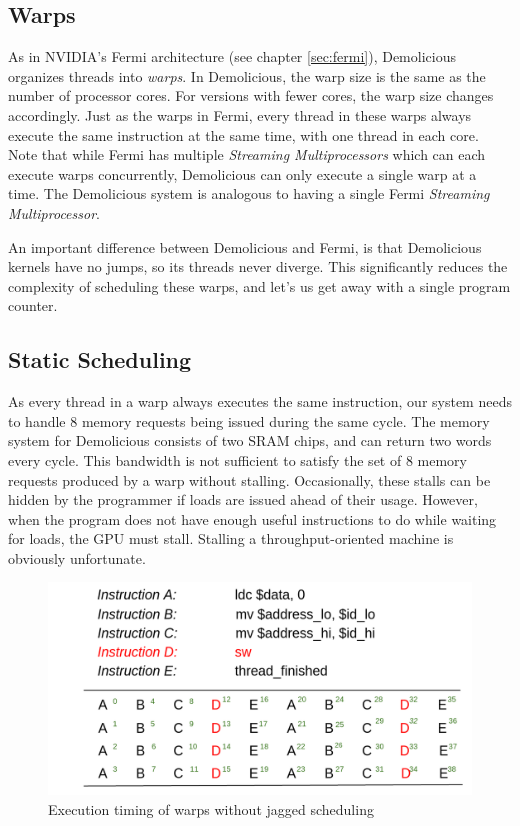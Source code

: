 \documentclass[../main/report.tex]{subfiles}
\begin{document}
\subsection{Warps}
\label{subsec:warps}

As in NVIDIA's Fermi architecture (see chapter \ref{sec:fermi}), Demolicious organizes threads into \emph{warps}.
In Demolicious, the warp size is the same as the number of processor cores.
For versions with fewer cores, the warp size changes accordingly.
Just as the warps in Fermi, every thread in these warps always execute the same instruction at the same time, with one thread in each core.
Note that while Fermi has multiple \emph{Streaming Multiprocessors} which can each execute warps concurrently, Demolicious can only execute a single warp at a time.
The Demolicious system is analogous to having a single Fermi \emph{Streaming Multiprocessor}.

An important difference between Demolicious and Fermi, is that Demolicious kernels have no jumps, so its threads never diverge.
This significantly reduces the complexity of scheduling these warps, and let's us get away with a single program counter.

\subsection{Static Scheduling}

As every thread in a warp always executes the same instruction, our system needs to handle 8 memory requests being issued during the same cycle.
The memory system for Demolicious consists of two SRAM chips, and can return two words every cycle.
This bandwidth is not sufficient to satisfy the set of 8 memory requests produced by a warp without stalling.
Occasionally, these stalls can be hidden by the programmer if loads are issued ahead of their usage.
However, when the program does not have enough useful instructions to do while waiting for loads, the GPU must stall.
Stalling a throughput-oriented machine is obviously unfortunate.

\begin{figure}[htp]
\centering
\includegraphics[scale=0.25]{../gpu/diagrams/uten_jaktstart_num.png}
\caption{Execution timing of warps without jagged scheduling}
\label{fig:nojagged}
\end{figure}
\end{document}
